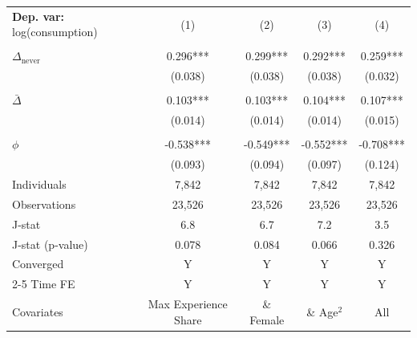 \begin{tabular}{l cccc} \toprule  \textbf{Dep. var:}  log(consumption) 
                    &\multicolumn{1}{c}{(1)}   &\multicolumn{1}{c}{(2)}   &\multicolumn{1}{c}{(3)}   &\multicolumn{1}{c}{(4)}   \\
                    &               &               &               &               \\
\addlinespace
$\Delta_{\text{never}}$&       0.296***&       0.299***&       0.292***&       0.259***\\
                    &     (0.038)   &     (0.038)   &     (0.038)   &     (0.032)   \\
                    &               &               &               &               \\
\addlinespace
$\bar{\Delta}$      &       0.103***&       0.103***&       0.104***&       0.107***\\
                    &     (0.014)   &     (0.014)   &     (0.014)   &     (0.015)   \\
                    &               &               &               &               \\
\addlinespace
$\phi$              &      -0.538***&      -0.549***&      -0.552***&      -0.708***\\
                    &     (0.093)   &     (0.094)   &     (0.097)   &     (0.124)   \\
\addlinespace
Individuals         &       7,842   &       7,842   &       7,842   &       7,842   \\
Observations        &      23,526   &      23,526   &      23,526   &      23,526   \\
J-stat              &         6.8   &         6.7   &         7.2   &         3.5   \\
J-stat (p-value)    &       0.078   &       0.084   &       0.066   &       0.326   \\
Converged           &           Y   &           Y   &           Y   &           Y   \\
\cmidrule{2-5} Time FE & Y & Y & Y & Y \\ Covariates & Max Experience Share & \& Female & \& Age$^2$ & All \\ \bottomrule \end{tabular}
